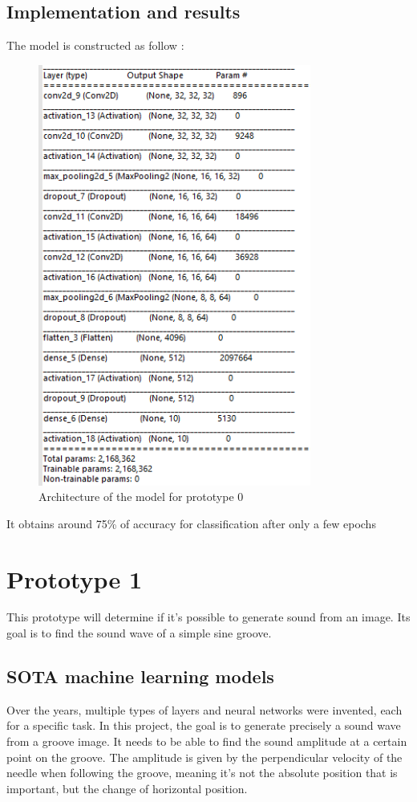 \documentclass[12pt, twoside]{article}
\begin{document}
\subsection{Implementation and results}
The model is constructed as follow : 
\begin{figure}
	\centering
	\includegraphics[width=0.8\textwidth]{../images/prototype0_summary.png}
	\caption{Architecture of the model for prototype 0}
	\label{prototype0_summary}
\end{figure}

It obtains around 75\% of accuracy for classification after only a few epochs
\section{Prototype 1}
This prototype will determine if it's possible to generate sound from an image. Its goal is to find the sound wave of a simple sine groove.
\subsection{SOTA machine learning models}
Over the years, multiple types of layers and neural networks were invented, each for a specific task\cite{aiml}. In this project, the goal is to generate precisely a sound wave from a groove image. It needs to be able to find the sound amplitude at a certain point on the groove. The amplitude is given by the perpendicular velocity of the needle when following the groove, meaning it's not the absolute position that is important, but the change of horizontal position.
\end{document}
